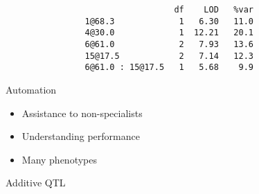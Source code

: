 \documentclass[12pt]{article}
\newcommand{\headsize}{\fontsize{35}{35} \selectfont}
\newcommand{\smallersize}{\fontsize{20}{25} \selectfont}
\begin{document}
\begin{verbatim}
                                  df    LOD   %var
                1@68.3             1   6.30   11.0
                4@30.0             1  12.21   20.1
                6@61.0             2   7.93   13.6
                15@17.5            2   7.14   12.3
                6@61.0 : 15@17.5   1   5.68    9.9
\end{verbatim}




\newpage

\headsize \color{myyellow}
\hfill \begin{minipage}{5.75in}
\centering
Automation
\end{minipage}

\vspace{3cm} \color{mywhite} \smallersize

\hfill \begin{minipage}{10in}
\begin{itemize}
\itemsep24pt

\item Assistance to non-specialists

\item Understanding performance

\item Many phenotypes

\end{itemize}
\end{minipage}





\newpage


\headsize \color{myyellow}
\hfill \begin{minipage}{5.75in}
\centering
Additive QTL
\end{minipage}

\vspace{2cm} \color{mywhite} \smallersize
\end{document}

